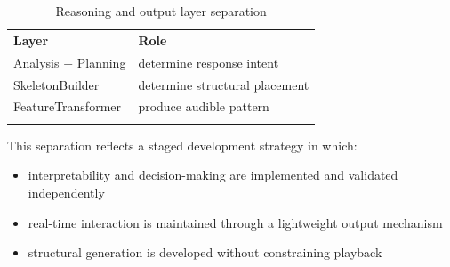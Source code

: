 \begin{longtable}[]{@{}
  >{\raggedright\arraybackslash}p{}
  >{\raggedright\arraybackslash}p{}@{}}
\caption{Reasoning and output layer separation}\label{tab:output-layer-separation}\\
\toprule\noalign{}
\begin{minipage}[b]{\linewidth}\centering
\textbf{Layer}
\end{minipage} & \begin{minipage}[b]{\linewidth}\centering
\textbf{Role}
\end{minipage} \\
\begin{minipage}[b]{\linewidth}\raggedright
Analysis + Planning
\end{minipage} & \begin{minipage}[b]{\linewidth}\raggedright
determine response intent
\end{minipage} \\
\begin{minipage}[b]{\linewidth}\raggedright
SkeletonBuilder
\end{minipage} & \begin{minipage}[b]{\linewidth}\raggedright
determine structural placement
\end{minipage} \\
\begin{minipage}[b]{\linewidth}\raggedright
FeatureTransformer
\end{minipage} & \begin{minipage}[b]{\linewidth}\raggedright
produce audible pattern
\end{minipage} \\
\midrule\noalign{}
\endhead
\bottomrule\noalign{}
\endlastfoot
\end{longtable}


This separation reflects a staged development strategy in which:

\begin{itemize}
\item
  interpretability and decision-making are implemented and validated
  independently
\item
  real-time interaction is maintained through a lightweight output
  mechanism
\item
  structural generation is developed without constraining playback
\end{itemize}


